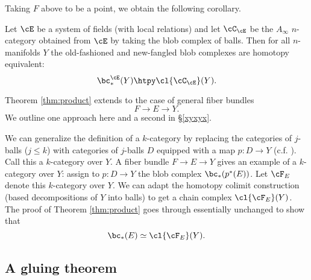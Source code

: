 
\medskip

Taking $F$ above to be a point, we obtain the following corollary.

\begin{cor}
\label{cor:new-old}
Let $\cE$ be a system of fields (with local relations) and let $\cC_\cE$ be the $A_\infty$
$n$-category obtained from $\cE$ by taking the blob complex of balls.
Then for all $n$-manifolds $Y$ the old-fashioned and new-fangled blob complexes are
homotopy equivalent:
\[
	\bc^\cE_*(Y) \htpy \cl{\cC_\cE}(Y) .
\]
\end{cor}

\medskip

Theorem \ref{thm:product} extends to the case of general fiber bundles
\[
	F \to E \to Y .
\]
We outline one approach here and a second in \S \ref{xyxyx}.

We can generalize the definition of a $k$-category by replacing the categories
of $j$-balls ($j\le k$) with categories of $j$-balls $D$ equipped with a map $p:D\to Y$
(c.f. \cite{MR2079378}).
Call this a $k$-category over $Y$.
A fiber bundle $F\to E\to Y$ gives an example of a $k$-category over $Y$:
assign to $p:D\to Y$ the blob complex $\bc_*(p^*(E))$.
Let $\cF_E$ denote this $k$-category over $Y$.
We can adapt the homotopy colimit construction (based decompositions of $Y$ into balls) to
get a chain complex $\cl{\cF_E}(Y)$.
The proof of Theorem \ref{thm:product} goes through essentially unchanged 
to show that
\[
	\bc_*(E) \simeq \cl{\cF_E}(Y) .
\]







\subsection{A gluing theorem}
\label{sec:gluing}

